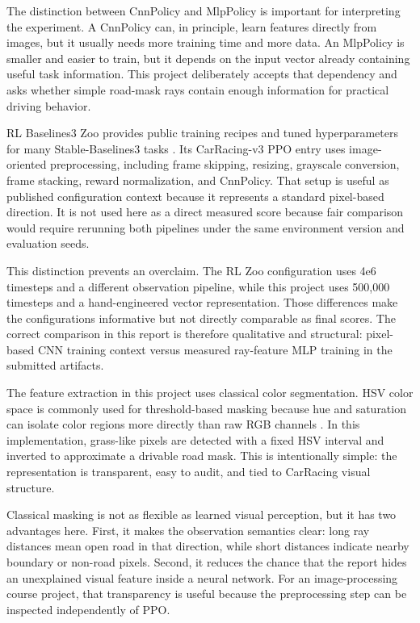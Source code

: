\documentclass[conference]{IEEEtran}
\begin{document}
The distinction between CnnPolicy and MlpPolicy is important for interpreting the experiment. A CnnPolicy can, in principle, learn features directly from images, but it usually needs more training time and more data. An MlpPolicy is smaller and easier to train, but it depends on the input vector already containing useful task information. This project deliberately accepts that dependency and asks whether simple road-mask rays contain enough information for practical driving behavior.

RL Baselines3 Zoo provides public training recipes and tuned hyperparameters for many Stable-Baselines3 tasks \cite{ref5}. Its CarRacing-v3 PPO entry uses image-oriented preprocessing, including frame skipping, resizing, grayscale conversion, frame stacking, reward normalization, and CnnPolicy. That setup is useful as published configuration context because it represents a standard pixel-based direction. It is not used here as a direct measured score because fair comparison would require rerunning both pipelines under the same environment version and evaluation seeds.

This distinction prevents an overclaim. The RL Zoo configuration uses 4e6 timesteps and a different observation pipeline, while this project uses 500,000 timesteps and a hand-engineered vector representation. Those differences make the configurations informative but not directly comparable as final scores. The correct comparison in this report is therefore qualitative and structural: pixel-based CNN training context versus measured ray-feature MLP training in the submitted artifacts.

The feature extraction in this project uses classical color segmentation. HSV color space is commonly used for threshold-based masking because hue and saturation can isolate color regions more directly than raw RGB channels \cite{ref6}. In this implementation, grass-like pixels are detected with a fixed HSV interval and inverted to approximate a drivable road mask. This is intentionally simple: the representation is transparent, easy to audit, and tied to CarRacing visual structure.

Classical masking is not as flexible as learned visual perception, but it has two advantages here. First, it makes the observation semantics clear: long ray distances mean open road in that direction, while short distances indicate nearby boundary or non-road pixels. Second, it reduces the chance that the report hides an unexplained visual feature inside a neural network. For an image-processing course project, that transparency is useful because the preprocessing step can be inspected independently of PPO.
\end{document}
